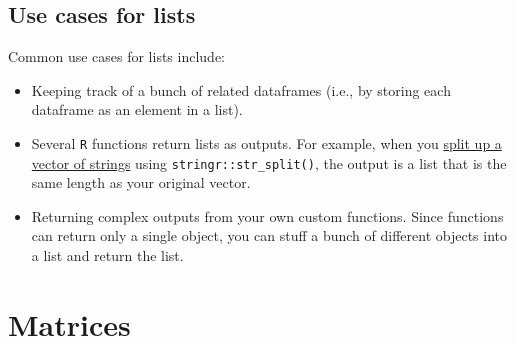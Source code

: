 \documentclass[
]{book}
\newenvironment{Shaded}{\begin{snugshade}}{\end{snugshade}}
\newcommand{\DecValTok}[1]{\textcolor[rgb]{0.00,0.00,0.81}{#1}}
\newcommand{\FunctionTok}[1]{\textcolor[rgb]{0.00,0.00,0.00}{#1}}
\newcommand{\NormalTok}[1]{#1}
\newcommand{\OtherTok}[1]{\textcolor[rgb]{0.56,0.35,0.01}{#1}}
\newcommand{\SpecialCharTok}[1]{\textcolor[rgb]{0.00,0.00,0.00}{#1}}
\newcommand{\StringTok}[1]{\textcolor[rgb]{0.31,0.60,0.02}{#1}}
\begin{document}
\begin{Shaded}
\end{Shaded}

\hypertarget{use-cases-for-lists}{%
\subsection*{Use cases for lists}\label{use-cases-for-lists}}

Common use cases for lists include:

\begin{itemize}
\item
  Keeping track of a bunch of related dataframes (i.e., by storing each dataframe as an element in a list).
\item
  Several \texttt{R} functions return lists as outputs. For example, when you \protect\hyperlink{text}{split up a vector of strings} using \texttt{stringr::str\_split()}, the output is a list that is the same length as your original vector.
\item
  Returning complex outputs from your own custom functions. Since functions can return only a single object, you can stuff a bunch of different objects into a list and return the list.
\end{itemize}

\hypertarget{matrices}{%
\section*{Matrices}\label{matrices}}
\end{document}
